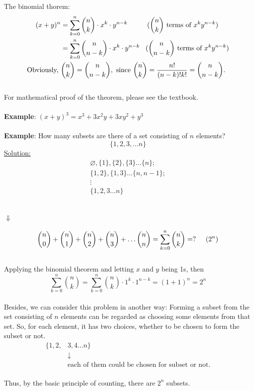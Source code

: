 \documentclass[11pt, letterpaper]{article}
\begin{document}
\noindent
The binomial thorem:
\begin{align*}
  (x+y)^n &= \sum_{k=0}^n \binom{n}{k} \cdot x^k \cdot y^{n-k} \hspace{1.0cm} (\binom{n}{k} \text{ terms of } x^k y^{n-k}) \\
  &= \sum_{k=0}^n \binom{n}{n-k} \cdot x^k \cdot y^{n-k} \hspace{0.3cm} (\binom{n}{n-k} \text{ terms of } x^k y^{n-k}) \\
  \text{Obviously, } &\binom{n}{k} = \binom{n}{n-k}, \text{ since } \binom{n}{k} = \frac{n!}{(n-k)!k!} = \binom{n}{n-k}.
\end{align*} \\
For mathematical proof of the theorem, please see the textbook. \\ \\
\noindent
\textbf{Example}: $(x+y)^3 = x^3 + 3x^2y + 3xy^2 + y^3$ \\ \\
\noindent
\textbf{Example}: How many subsets are there of a set consisting of $n$ elements?
\begin{equation*}
  \{1,2,3, \dots n\}
\end{equation*}
\noindent
\underline{Solution:}
\begin{equation*}
  \begin{array}{l}
    \varnothing, \{1\}, \{2\}, \{3\} \dots \{n\}; \\
    \{1,2\}, \{1,3\} \dots \{n, n-1\}; \\
    \vdots \\
    \{1,2,3 \dots n\}
  \end{array}
\end{equation*} \\
\begin{center}
$\Downarrow$ \\
\end{center}
\begin{equation*}
  \binom{n}{0} + \binom{n}{1} + \binom{n}{2} + \binom{n}{3} + \dots \binom{n}{n} = \sum_{k=0}^n \binom{n}{k} = ? \hspace{0.5cm} (2^n)
\end{equation*} \\
Applying the binomial theorem and letting $x$ and $y$ being 1s, then
\begin{equation*}
  \sum_{k=0}^n \binom{n}{k} = \sum_{k=0}^n \binom{n}{k}\cdot1^k\cdot1^{n-k} = (1+1)^n = 2^n
\end{equation*} \\
Besides, we can consider this problem in another way: Forming a subset from the set consisting of $n$ elements can be regarded as choosing some elements from that set. So, for each element, it has two choices, whether to be chosen to form the subset or not.
\begin{align*}
  \{1, 2, &3, 4\dots n\} \\
  &\downarrow \\
  &\text{each of them could be chosen for subset or not.}
\end{align*} \\
Thus, by the basic principle of counting, there are $2^n$ subsets. \\ \\
\end{document}
